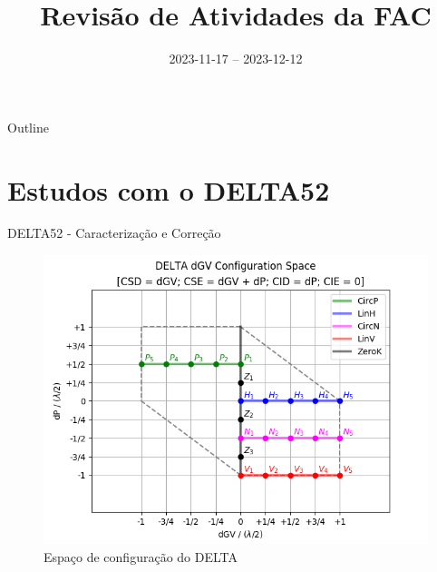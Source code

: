 \documentclass[aspectratio=169]{beamer}					  %
\title{Revisão de Atividades da FAC}	%
\institute{LNLS.DAC.FAC}				%
\date{2023-11-17 -- 2023-12-12}			%
\begin{document}
\begin{frame}
  \titlepage
  \href{https://github.com/lnls-fac/doc-review-dac-fac}{}
  \href{https://www.overleaf.com/read/sbdjxtzfchrm}{}
\end{frame}

\begin{frame}{Outline}
  \tableofcontents
\end{frame}



\section{Estudos com o DELTA52}

\begin{frame}{DELTA52 - Caracterização e Correção}
    \begin{figure}[H]
    		\centering
            \includegraphics[width=.8\textwidth]{2023-12-12/figures/id-delta-dgv-config-space.png}
            \caption{Espaço de configuração do DELTA}
            \label{fig:delta-config-space}
    \end{figure}
\end{frame}
\end{document}
